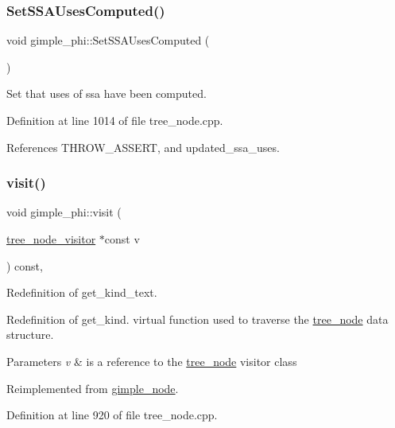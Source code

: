 \subsubsection{\texorpdfstring{Set\+S\+S\+A\+Uses\+Computed()}{SetSSAUsesComputed()}}
{\footnotesize\ttfamily void gimple\+\_\+phi\+::\+Set\+S\+S\+A\+Uses\+Computed (\begin{DoxyParamCaption}{ }\end{DoxyParamCaption})}



Set that uses of ssa have been computed. 



Definition at line 1014 of file tree\+\_\+node.\+cpp.



References T\+H\+R\+O\+W\+\_\+\+A\+S\+S\+E\+RT, and updated\+\_\+ssa\+\_\+uses.

\mbox{\label{structgimple__phi_a833830c256d428292a6d38e32cb7eabd}} 
\subsubsection{\texorpdfstring{visit()}{visit()}}
{\footnotesize\ttfamily void gimple\+\_\+phi\+::visit (\begin{DoxyParamCaption}\item[{\hyperlink{classtree__node__visitor}{tree\+\_\+node\+\_\+visitor} $\ast$const}]{v }\end{DoxyParamCaption}) const\hspace{0.3cm}{\ttfamily [override]}, {\ttfamily [virtual]}}



Redefinition of get\+\_\+kind\+\_\+text. 

Redefinition of get\+\_\+kind. virtual function used to traverse the \hyperlink{classtree__node}{tree\+\_\+node} data structure. 
\begin{DoxyParams}{Parameters}
{\em v} & is a reference to the \hyperlink{classtree__node}{tree\+\_\+node} visitor class \\
\hline
\end{DoxyParams}


Reimplemented from \hyperlink{structgimple__node_a337b029a3aca9c1b96311b6e6668f7f3}{gimple\+\_\+node}.



Definition at line 920 of file tree\+\_\+node.\+cpp.



